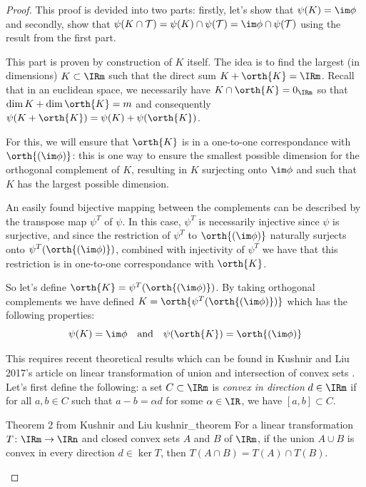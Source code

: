 \begin{proof}
    This proof is devided into two parts: firstly, let's show that $\psi(K) = \im\phi$ and secondly, show that $\psi(K\cap \mathcal{T}) = \psi(K)\cap \psi(\mathcal{T}) = \im\phi \cap \psi(\mathcal{T}) $ using the result from the first part.

    This part is proven by construction of $K$ itself. The idea is to find the largest (in dimensions) $K\subset\IRm$ such that the direct sum $K+\orth{K} = \IRm$. Recall that in an euclidean space, we necessarily have $K\cap \orth{K} = 0_{\IRm}$ so that $\dim K + \dim \orth{K} = m$ and consequently $\psi(K+\orth{K}) = \psi(K) + \psi(\orth{K})$.

    For this, we will ensure that $\orth{K}$ is in a one-to-one correspondance with $\orth{(\im \phi)}$: this is one way to ensure the smallest possible dimension for the orthogonal complement of $K$, resulting in $K$ surjecting onto $\im \phi$ and such that $K$ has the largest possible dimension.

    An easily found bijective mapping between the complements can be described by the transpose map $\psi^T$ of $\psi$. In this case, $\psi^T$ is necessarily injective since $\psi$ is surjective, and since the restriction of $\psi^T$ to $\orth{(\im \phi)}$ naturally surjects onto $\psi^T(\orth{(\im \phi)})$, combined with injectivity of $\psi^T$ we have that this restriction is in one-to-one correspondance with $\orth{K}$.

    So let's define $\orth{K} = \psi^T(\orth{(\im \phi)})$. By taking orthogonal complements we have defined $K = \orth{\psi^T(\orth{(\im \phi)})}$ which has the following properties:
    $$\psi(K) = \im \phi \quad \text{and}\quad \psi(\orth{K}) = \orth{(\im\phi)}$$
    

    This requires recent theoretical results which can be found in Kushnir and Liu 2017's article on linear transformation of union and intersection of convex sets \cite{kushnirLinearTransformationsIntersections}. Let's first define the following:
    a set $C\subset \IRm$ is \emph{convex in direction} $d\in\IRm$ if for all $a, b\in C$ such that $a-b=\alpha d$ for some $\alpha\in \IR$, we have $[a,b]\subset C$.

    \begin{lemmabox}{Theorem 2 from Kushnir and Liu \cite{kushnirLinearTransformationsIntersections}}{kushnir_theorem}
        For a linear transformation $T \colon \IRm \rightarrow \IRn$ and closed convex sets $A$ and $B$ of $\IRm$, if the union $A\cup B$ is convex in every direction $d\in \ker T$, then $T(A\cap B) = T(A)\cap T(B)$.
    \end{lemmabox}


\end{proof}
